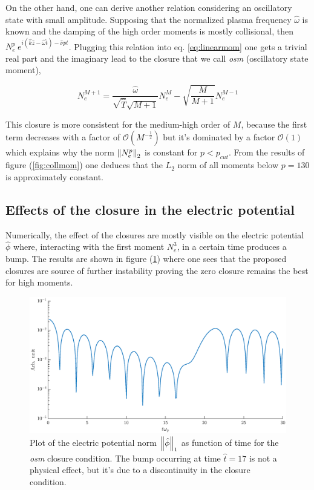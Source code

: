 \documentclass[final]{jpp}
\begin{document}
On the other hand, one can derive another relation considering an oscillatory state with small amplitude. Supposing that the normalized plasma frequency $\hat{\omega}$ is known and the damping of the high order moments is mostly collisional, then $N_e^p ~ e^{i(\hat{k}\hat{z} - \hat{\omega}\hat{t}) - \hat{\nu} p t}$. Plugging this relation into eq. \ref{eq:linearmom} one gets a trivial real part and the imaginary lead to the closure that we call \textit{osm} (oscillatory state moment),

\begin{equation}
N_e^{M+1} = \frac{\hat{\omega}}{\sqrt{\hat{T}} \sqrt{M+1}} N_e^M - \sqrt{\frac{M}{M+1}} N_e^{M-1}
\end{equation}

This closure is more consistent for the medium-high order of $M$, because the first term decreases with a factor of $\mathcal{O}(M^{-\frac{1}{2}})$ but it's dominated by a factor $\mathcal{O}(1)$ which explains why the norm $\left\lVert N_e^p\right\rVert_2$ is constant for $p < p_{cut}$.
From the results of figure (\ref{fig:collmom}) one deduces that the $L_2$ norm of all moments below $p = 130$ is approximately constant.

\subsection{Effects of the closure in the electric potential}

Numerically, the effect of the closures are mostly visible on the electric potential $\hat{\phi}$ where, interacting with the first moment $N_e^3$, in a certain time produces a bump. The results are shown in figure (\ref{fig:closures}) where one sees that the proposed closures are source of further instability proving the zero closure remains the best for high moments.

\begin{figure}
\centering
\includegraphics[width=\textwidth]{closure_same.eps}
\caption{Plot of the electric potential norm $\left\lVert\hat{\phi}\right\rVert_1$ as function of time for the \textit{osm} closure condition. The bump occurring at time $\hat{t} = 17$ is not a physical effect, but it's due to a discontinuity in the closure condition.}
\label{fig:closures}
\end{figure}
\end{document}
